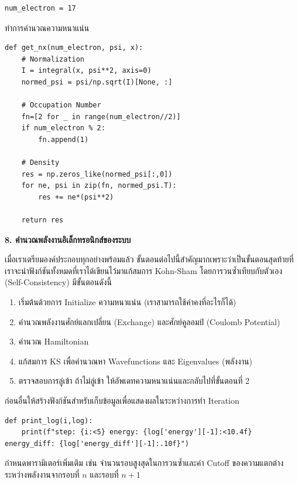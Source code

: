 \begin{lstlisting}[style=MyPython]
num_electron = 17
\end{lstlisting}

\noindent ทำการคำนวณความหนาแน่น

\begin{lstlisting}[style=MyPython]
def get_nx(num_electron, psi, x):
    # Normalization
    I = integral(x, psi**2, axis=0)
    normed_psi = psi/np.sqrt(I)[None, :]
    
    # Occupation Number
    fn=[2 for _ in range(num_electron//2)]
    if num_electron % 2:
        fn.append(1)

    # Density
    res = np.zeros_like(normed_psi[:,0])
    for ne, psi in zip(fn, normed_psi.T):
        res += ne*(psi**2)

    return res
\end{lstlisting}

\vspace{1em}
\noindent \textbf{8. คำนวณพลังงานอิเล็กทรอนิกส์ของระบบ}

เมื่อเราเตรียมองค์ประกอบทุกอย่างพร้อมแล้ว ขั้นตอนต่อไปนี้สำคัญมากเพราะว่าเป็นขั้นตอนสุดท้ายที่เราจะนำฟังก์ชันทั้งหมดที่เราได้เขียนไว้มาแก้สมการ 
Kohn-Sham โดยการวนซ้ำเทียบกับตัวเอง (Self-Consistency) มีขั้นตอนดังนี้

\begin{enumerate}[topsep=0pt]
    \item เริ่มต้นด้วยการ Initialize ความหนาแน่น (เราสามารถใช้ค่าคงที่อะไรก็ได้)
    \item คำนวณพลังงานศักย์แลกเปลี่ยน (Exchange) และศักย์คูลอมป์ (Coulomb Potential)
    \item คำนวณ Hamiltonian
    \item แก้สมการ KS เพื่อคำนวณหา Wavefunctions และ Eigenvalues (พลังงาน)
    \item ตรวจสอบการลู่เข้า ถ้าไม่ลู่เข้า ให้อัพเดทความหนาแน่นและกลับไปที่ขั้นตอนที่ 2
\end{enumerate}

\noindent ก่อนอื่นให้สร้างฟังก์ชันสำหรับเก็บข้อมูลเพื่อแสดงผลในระหว่างการทำ Iteration

\begin{lstlisting}[style=MyPython]
def print_log(i,log):
    print(f"step: {i:<5} energy: {log['energy'][-1]:<10.4f} energy_diff: {log['energy_diff'][-1]:.10f}")
\end{lstlisting}

กำหนดพารามิเตอร์เพิ่มเติม เช่น จำนวนรอบสูงสุดในการวนซ้ำและค่า Cutoff ของความแตกต่างระหว่างพลังงานจากรอบที่ $n$ และรอบที่ $n+1$

